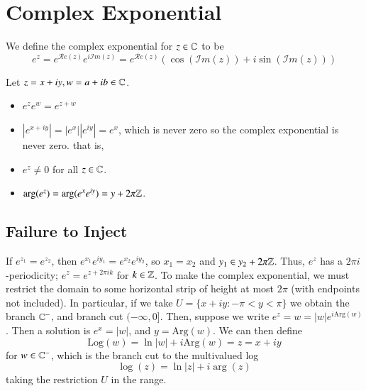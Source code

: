 \documentclass[12pt, a4paper, oneside, openright, titlepage]{book}
\begin{document}
\section{Complex Exponential}

\begin{defn}
    We define the complex exponential for $z \in \mathbb C$ to be \begin{equation*}
        e^z = e^{\mathscr{R}e(z)}e^{i\mathscr{I}m(z)} = e^{\mathscr{R}e(z)}(\cos(\mathscr{I}m(z))+i\sin(\mathscr{I}m(z)))
    \end{equation*}
\end{defn}

\begin{props}
    Let $z = x+iy, w = a+ib \in \mathbb C$. \begin{itemize}
        \item $e^ze^w = e^{z+w}$
        \item $|e^{x+iy}| = |e^x||e^{iy}| = e^x$, which is never zero so the complex exponential is never zero. that is,
        \item $e^z \neq 0$ for all $z \in \mathbb C$.
        \item $\arg(e^z) = \arg(e^xe^{iy}) = y+2\pi\mathbb Z$.
    \end{itemize}
\end{props}


\subsection{Failure to Inject}

If $e^{z_1} = e^{z_2}$, then $e^{x_1}e^{iy_1} = e^{x_2}e^{iy_2}$, so $x_1 = x_2$ and $y_1 \in y_2 + 2\pi\mathbb Z$. Thus, $e^z$ has a $2\pi i$-periodicity; $e^z = e^{z+2\pi ik}$ for $k \in \mathbb Z$. To make the complex exponential, we must restrict the domain to some horizontal strip of height at most $2\pi$ (with endpoints not included). In particular, if we take $U = \{x+iy: -\pi < y < \pi\}$ we obtain the branch $\mathbb C^-$, and branch cut $(-\infty,0]$. Then, suppose we write $e^z = w = |w|e^{i\text{Arg}(w)}$. Then a solution is $e^x = |w|$, and $y = \text{Arg}(w)$. We can then define \begin{equation*}
    \text{Log}(w) = \ln|w| +i\text{Arg}(w) = z = x+iy
\end{equation*}
for $w \in \mathbb C^-$, which is the branch cut to the multivalued log \begin{equation*}
    \log(z) = \ln|z|+i\arg(z)
\end{equation*}
taking the restriction $U$ in the range.
\end{document}

